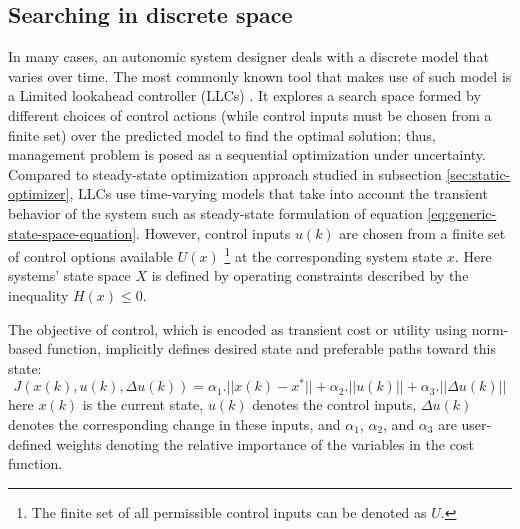 \subsection{Searching in discrete space}
In many cases, an autonomic system designer deals with a discrete model that varies over time.  
The most commonly known tool that makes use of such model is a Limited lookahead controller (LLCs) \cite{abdelwahed2004control, kandasamy2004self}.       
It explores a search space formed by different choices of control actions (while control inputs must be chosen from a finite set) over the predicted model \cite{bhat2006enabling} to find the optimal solution; thus, management problem is posed as a sequential optimization under uncertainty. 
Compared to steady-state optimization approach studied in subsection \ref{sec:static-optimizer}, LLCs use time-varying models that take into account the transient behavior of the system such as steady-state formulation of equation \ref{eq:generic-state-space-equation}.
However, control inputs $u(k)$ are chosen from a finite set of control options available $U(x)$ \footnote{The finite set of all permissible control inputs can be denoted as $U$.} at the corresponding system state $x$.
Here systems' state space $X$ is defined by operating constraints described by the inequality $H(x) \leq 0$.

The objective of control, which is encoded as transient cost or utility using norm-based function, implicitly defines desired state and preferable paths toward this state:
\begin{equation} \label{eq:llc-cost-general}
J(x(k), u(k),\Delta u(k)) = \alpha_1. ||x(k) - x^*||+\alpha_2.||u(k)||+\alpha_3.||\Delta u(k)||	
\end{equation}
here $x(k)$ is the current state, $u(k)$ denotes the control inputs, $\Delta u(k)$ denotes the corresponding change in these inputs, 
and $\alpha_1$, $\alpha_2$, and $\alpha_3$ are user-defined weights denoting the relative importance of the variables in the cost function.


